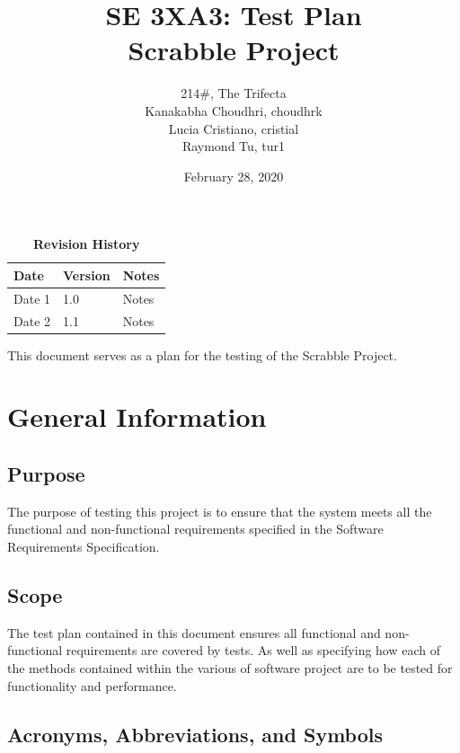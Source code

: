 \documentclass[12pt, titlepage]{article}
\title{SE 3XA3: Test Plan\\Scrabble Project}
\author{214\#, The Trifecta
		\\ Kanakabha Choudhri, choudhrk
		\\ Lucia Cristiano, cristial
		\\ Raymond Tu, tur1
}
\date{February 28, 2020}
\begin{document}
\maketitle

\tableofcontents
\listoftables
\listoffigures

\begin{table}[bp]
\caption{\bf Revision History}
\begin{tabularx}{\textwidth}{p{3cm}p{2cm}X}
\toprule {\bf Date} & {\bf Version} & {\bf Notes}\\
\midrule
Date 1 & 1.0 & Notes\\
Date 2 & 1.1 & Notes\\
\bottomrule
\end{tabularx}
\end{table}

\newpage


This document serves as a plan for the testing of the Scrabble Project.

\section{General Information} 

\subsection{Purpose}

The purpose of testing this project is to ensure that the system meets all the functional and non-functional requirements specified in the Software Requirements Specification.

\subsection{Scope}

The test plan contained in this document ensures all  functional and non-functional requirements are covered by tests. As well as specifying how each of the methods contained within the various of software project are to be tested for functionality and performance.

\subsection{Acronyms, Abbreviations, and Symbols}
	
\end{document}
